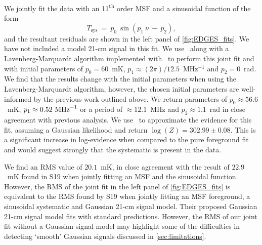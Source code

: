 We jointly fit the data with an 11\textsuperscript{th} order MSF and a sinusoidal function of the form
\begin{equation}
    T_\mathrm{sys}~=~p_0~\sin(p_1~\nu~-~p_2),
    \label{eq:sine_sys}
\end{equation}
and the resultant residuals are shown in the left panel of \cref{fig:EDGES_fits}. We have not included a model 21-cm signal in this fit. We use \maxsmooth~along with a Lavenberg-Marquardt algorithm implemented with \scipy~to perform this joint fit and with initial parameters of $p_0 = 60$~mK, $p_1\approx (2\pi)/12.5$~MHz$^{-1}$ and $p_2 = 0$~rad. We find that the results change with the initial parameters when using the Lavenberg-Marquardt algorithm, however, the chosen initial parameters are well-informed by the previous work outlined above. We return parameters of $p_0 \approx 56.6$~mK, $p_1 \approx 0.52~\textnormal{MHz}^{-1}$ or a period of $ \approx 12.1$~MHz and $p_2 \approx 1.1$~rad in close agreement with previous analysis. We use \multinest~to approximate the evidence for this fit, assuming a Gaussian likelihood and return $\log(Z)=302.99\pm0.08$. This is a significant increase in log-evidence when compared to the pure foreground fit and would suggest strongly that the systematic is present in the data.

We find an RMS value of $20.1$~mK, in close agreement with the result of $22.9$~mK found in S19 when jointly fitting an MSF and the sinusoidal function. However, the RMS of the joint fit in the left panel of \cref{fig:EDGES_fits} is equivalent to the RMS found by S19 when jointly fitting an MSF foreground, a sinusoidal systematic and Gaussian 21-cm signal model. Their proposed Gaussian 21-cm signal model fits with standard predictions. However, the RMS of our joint fit without a Gaussian signal model may highlight some of the difficulties in detecting `smooth' Gaussian signals discussed in \cref{sec:limitations}.

